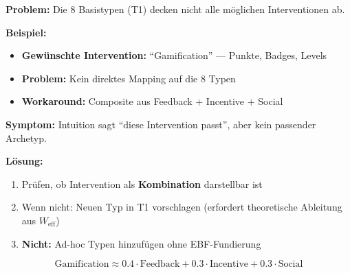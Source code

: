 \begin{tcolorbox}[colback=red!5!white, colframe=red!75!black,
    title=\textbf{Failure Mode 4: Fehlende Interventionstypen}]

\textbf{Problem:} Die 8 Basistypen (T1) decken nicht alle möglichen Interventionen ab.

\medskip
\textbf{Beispiel:}
\begin{itemize}[nosep]
    \item \textbf{Gewünschte Intervention:} ``Gamification'' --- Punkte, Badges, Levels
    \item \textbf{Problem:} Kein direktes Mapping auf die 8 Typen
    \item \textbf{Workaround:} Composite aus Feedback + Incentive + Social
\end{itemize}

\medskip
\textbf{Symptom:} Intuition sagt ``diese Intervention passt'', aber kein passender Archetyp.

\textbf{Lösung:}
\begin{enumerate}[nosep]
    \item Prüfen, ob Intervention als \textbf{Kombination} darstellbar ist
    \item Wenn nicht: Neuen Typ in T1 vorschlagen (erfordert theoretische Ableitung aus $W_{\text{eff}}$)
    \item \textbf{Nicht:} Ad-hoc Typen hinzufügen ohne EBF-Fundierung
\end{enumerate}

\begin{equation*}
\text{Gamification} \approx 0.4 \cdot \text{Feedback} + 0.3 \cdot \text{Incentive} + 0.3 \cdot \text{Social}
\end{equation*}

\end{tcolorbox}

